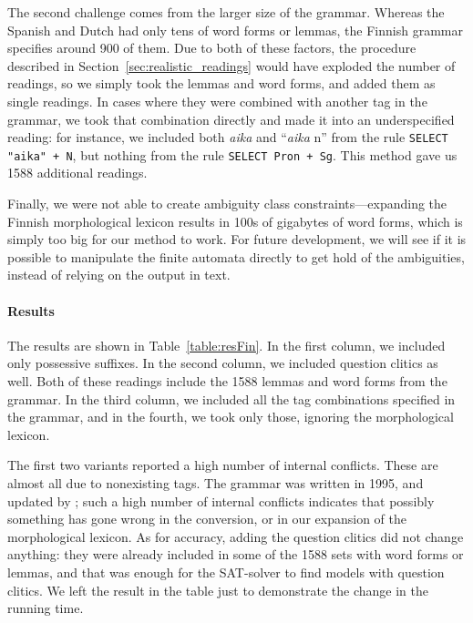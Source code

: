 {{The second challenge comes from the larger size of the grammar. Whereas the Spanish and Dutch had only tens of word forms or lemmas, the Finnish grammar specifies around 900 of them.
Due to both of these factors, the procedure described in Section~\ref{sec:realistic_readings} would have exploded the number of readings, so we simply took the lemmas and word forms, and added them as single readings. 
In cases where they were combined with another tag in the grammar, we took that combination directly and made it into an underspecified reading: for instance, we included both \emph{aika} and ``\emph{aika} n'' from the rule \texttt{SELECT "aika" + N},
but nothing from the rule \texttt{SELECT Pron + Sg}. This method gave us 1588 additional readings.

Finally, we were not able to create ambiguity class constraints---expanding the Finnish morphological lexicon results in 100s of gigabytes of word forms, which is simply too big for our method to work. 
For future development, we will see if it is possible to manipulate the finite automata directly to get hold of the ambiguities, instead of relying on the output in text.


\paragraph{Results}
The results are shown in Table~\ref{table:resFin}.
In the first column, we included only possessive suffixes. In the second column, we included question clitics as well.
Both of these readings include the 1588 lemmas and word forms from the grammar.
In the third column, we included all the tag combinations specified in the grammar, and in the fourth, we took only those, ignoring the morphological lexicon.

The first two variants reported a high number of internal conflicts. 
These are almost all due to nonexisting tags. The grammar was written in 1995, and updated by ; such a high number of internal conflicts indicates that possibly something has gone wrong in the conversion, or in our expansion of the morphological lexicon.
As for accuracy, adding the question clitics did not change anything: they were already included in some of the 1588 sets with word forms or lemmas, and that was enough for the SAT-solver to find models with question clitics.
We left the result in the table just to demonstrate the change in the running time.


}}
